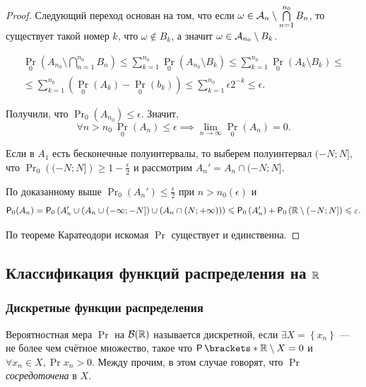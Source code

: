 \begin{proof}
	Следующий переход основан на том, что если \(\omega \in \mathcal{A}_n \setminus \bigcap\limits_{n=1}^{n_0}B_n \), то существует такой номер $ k $, что \(\omega \notin B_k\), а значит \(\omega \in \mathcal{A}_{n_0} \setminus B_k \).
	
	\begin{multline*} 
	\Pr_0\left(A_{n_0} \setminus \bigcap\limits_{n=1}^{n_0}B_n\right)
	\leq \sum\limits_{k=1}^{n_0}\Pr_0\left(A_{n_0} \setminus B_k \right) \leq \sum\limits_{k=1}^{n_0} \Pr_0\left(A_k \setminus B_k \right) \leq \\ \leq
	\sum\limits_{k=1}^{n_0} \left( \Pr_0\left(A_k\right) - \Pr_0\left(b_k\right) \right) \leq 
	\sum\limits_{k=1}^{n_0}\epsilon2^{-k} \leq \epsilon.
	\end{multline*}
	
	Получили, что \(\Pr_0(A_{n_0}) \leq \epsilon\). Значит, 
	\[
	\forall n > n_0 \ \Pr_0(A_n) \leq \epsilon \implies  \lim\limits_{n \to \infty}\Pr_0(A_n) = 0.
	\]
	
	Если в $ A_1 $ есть бесконечные полуинтервалы, то выберем полуинтервал $ (-N; N] $, что \(\Pr_0\left((-N; N] \right) \geq 1 - \frac{\epsilon}{2}\) и рассмотрим \(A_n' = A_n \cap (-N; N].  \)
	
	По доказанному выше \(\Pr_0(A_n') \leq \frac{\epsilon}{2} \) при $ n > n_0(\epsilon) $ и 
	\[
	\Pr_0(A_n) = \Pr_0\left(A_n' \cup \left(A_n \cup (-\infty; -N] \right) \cup \left(A_n \cap (N; +\infty)  \right)  \right) \leq \Pr_0\left(A_n'\right) + \Pr_0\left(\R \setminus (-N; N] \right) \leq \epsilon.
	\]
	
	По теореме Каратеодори искомая $ \Pr $ существует и единственна.
\end{proof}

\subsection{Классификация функций распределения на $\mathbb{R}$}

\subsubsection{Дискретные функции распределения}

    Вероятностная мера $\Pr$ на $\mathcal{B}(\mathbb{R})$ называется дискретной, если $\exists X = \left\{ x_n
    \right\}$ --- не более чем счётное множество, такое что $\Pr{\R \setminus X} = 0$ и $\forall x_n \in X,
    \Pr{x_n} > 0$. Между прочим, в этом случае говорят, что $\Pr$ \emph{сосредоточена} в $X$.

